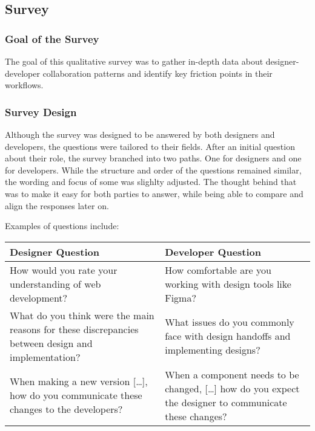 \newpage
\subsection{Survey}

\subsubsection{Goal of the Survey}
The goal of this qualitative survey was to gather in-depth data about designer-developer
collaboration patterns and identify key friction points in their workflows.

\subsubsection{Survey Design}
Although the survey was designed to be answered by both designers and developers, the questions were
tailored to their fields. After an initial question about their role, the survey branched into two
paths. One for designers and one for developers. While the structure and order of the questions
remained similar, the wording and focus of some was slighlty adjusted. The thought behind that was
to make it easy for both parties to answer, while being able to compare and align the responses
later on.

Examples of questions include: %
\begin{center}
    \begin{tabular}{|m{7.5cm}|m{7.5cm}|}
        \hline
        \textbf{Designer Question}                                                                         & \textbf{Developer Question}                                                                                \\
        \hline
        How would you rate your understanding of web development?                                          & How comfortable are you working with design tools like Figma?                                              \\
        \hline
        What do you think were the main reasons for these discrepancies between design and implementation? & What issues do you commonly face with design handoffs and implementing designs?                            \\
        \hline
        When making a new version [\dots], how do you communicate these changes to the developers?         & When a component needs to be changed, [\dots] how do you expect the designer to communicate these changes? \\
        \hline
    \end{tabular}
\end{center}

